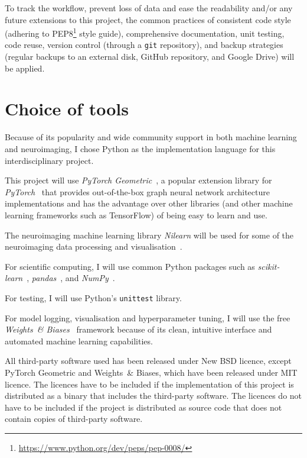 To track the workflow, prevent loss of data and ease the readability and/or any future extensions to this project, the common practices of consistent code style (adhering to PEP8\footnote{\url{https://www.python.org/dev/peps/pep-0008/}} style guide), comprehensive documentation, unit testing, code reuse, version control (through a \texttt{git} repository), and backup strategies (regular backups to an external disk, GitHub repository, and Google Drive) will be applied.

\section{Choice of tools}

Because of its popularity and wide community support in both machine learning and neuroimaging, I chose Python as the implementation language for this interdisciplinary project.

This project will use \textit{PyTorch Geometric}~\cite{fey2019pytorch}, a popular extension library for \textit{PyTorch}~\cite{pytorch} that provides out-of-the-box graph neural network architecture implementations and has the advantage over other libraries (and other machine learning frameworks such as TensorFlow) of being easy to learn and use. 

The neuroimaging machine learning library \textit{Nilearn} will be used for some of the neuroimaging data processing and visualisation~\cite{abraham2014machine, nilearn}.

For scientific computing, I will use common Python packages such as \textit{scikit-learn}~\cite{pedregosa2011scikit}, \textit{pandas}~\cite{mckinney2010scipy}, and \textit{NumPy}~\cite{walt2011numpy}. 

For testing, I will use Python's \texttt{unittest} library.

For model logging, visualisation and hyperparameter tuning, I will use the free \textit{Weights~\& Biases}~\cite{wandb} framework because of its clean, intuitive interface and automated machine learning capabilities.

All third-party software used has been released under New BSD licence, except PyTorch Geometric and Weights~\& Biases, which have been released under MIT licence. The licences have to be included if the implementation of this project is distributed as a binary that includes the third-party software. The licences do not have to be included if the project is distributed as source code that does not contain copies of third-party software. 

